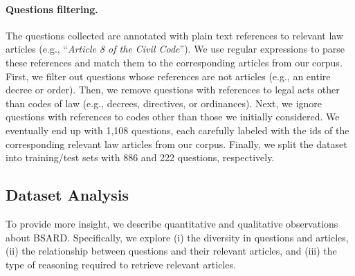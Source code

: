 \documentclass[11pt]{article}
\begin{document}
\paragraph{Questions filtering.}
The questions collected are annotated with plain text references to relevant law articles (e.g., “\textsl{Article 8 of the Civil Code}”). We use regular expressions to parse these references and match them to the corresponding articles from our corpus. First, we filter out questions whose references are not articles (e.g., an entire decree or order). Then, we remove questions with references to legal acts other than codes of law (e.g., decrees, directives, or ordinances). Next, we ignore questions with references to codes other than those we initially considered. We eventually end up with 1,108 questions, each carefully labeled with the ids of the corresponding relevant law articles from our corpus. Finally, we split the dataset into training/test sets with 886 and 222 questions, respectively.


\subsection{Dataset Analysis \label{subsec:dataset-analysis}}
To provide more insight, we describe quantitative and qualitative observations about BSARD. Specifically, we explore (i) the diversity in questions and articles, (ii) the relationship between questions and their relevant articles, and (iii) the type of reasoning required to retrieve relevant articles.
\end{document}

